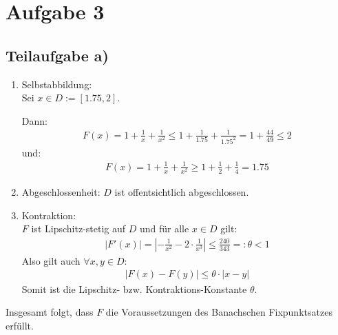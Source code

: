 \section*{Aufgabe 3}
\subsection*{Teilaufgabe a)}

\begin{enumerate}
\item Selbstabbildung: \\
	Sei $x \in D := [1.75 , 2]$.

	Dann:
	\begin{align}
		F(x) = 1 + \frac{1}{x} + \frac{1}{x^2} \le 1 + \frac{1}{1.75} + \frac{1}{1.75^2} = 1 + \frac{44}{49} \le 2
	\end{align}
	und: \\
	\begin{align}
		F(x) = 1 + \frac{1}{x} + \frac{1}{x^2} \ge 1 + \frac{1}{2} + \frac{1}{4} = 1.75
	\end{align}

\item Abgeschlossenheit: $D$ ist offentsichtlich abgeschlossen.
\item Kontraktion: \\ %
	$F$ ist Lipschitz-stetig auf $D$ und für alle $x \in D$ gilt: \\
	\begin{align}
		|F'(x)| = |-\frac{1}{x^2}-2 \cdot \frac{1}{x^3}| \le \frac{240}{343} =: \theta < 1
	\end{align}
	Also gilt auch $\forall x,y \in D $:
	\begin{align}
		|F(x) - F(y)| \le \theta \cdot |x - y|
	\end{align}
	Somit ist die Lipschitz- bzw. Kontraktions-Konstante $\theta$.
\end{enumerate}
Insgesamt folgt, dass $F$ die Voraussetzungen des Banachschen Fixpunktsatzes erfüllt.
